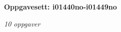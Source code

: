 \centerline{\bf Oppgavesett: i01440no-i01449no}
\vskip 10pt
\centerline{\it 10 oppgaver}\vskip 10pt
\vskip 10pt
